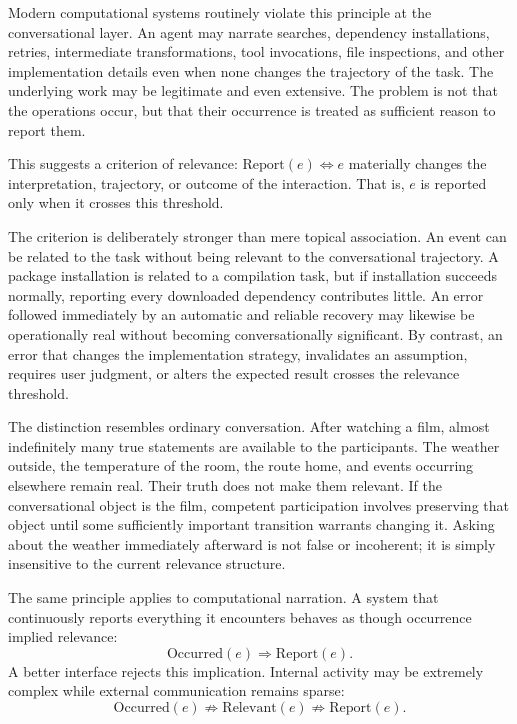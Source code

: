 Modern computational systems routinely violate this principle at the conversational layer. An agent may narrate searches, dependency installations, retries, intermediate transformations, tool invocations, file inspections, and other implementation details even when none changes the trajectory of the task. The underlying work may be legitimate and even extensive. The problem is not that the operations occur, but that their occurrence is treated as sufficient reason to report them.

This suggests a criterion of relevance: $\mathrm{Report}(e) \iff e$ materially changes the interpretation, trajectory, or outcome of the interaction. That is, $e$ is reported only when it crosses this threshold.

The criterion is deliberately stronger than mere topical association. An event can be related to the task without being relevant to the conversational trajectory. A package installation is related to a compilation task, but if installation succeeds normally, reporting every downloaded dependency contributes little. An error followed immediately by an automatic and reliable recovery may likewise be operationally real without becoming conversationally significant. By contrast, an error that changes the implementation strategy, invalidates an assumption, requires user judgment, or alters the expected result crosses the relevance threshold.

The distinction resembles ordinary conversation. After watching a film, almost indefinitely many true statements are available to the participants. The weather outside, the temperature of the room, the route home, and events occurring elsewhere remain real. Their truth does not make them relevant. If the conversational object is the film, competent participation involves preserving that object until some sufficiently important transition warrants changing it. Asking about the weather immediately afterward is not false or incoherent; it is simply insensitive to the current relevance structure.

The same principle applies to computational narration. A system that continuously reports everything it encounters behaves as though occurrence implied relevance:
\[
\mathrm{Occurred}(e) \Rightarrow \mathrm{Report}(e).
\]
A better interface rejects this implication. Internal activity may be extremely complex while external communication remains sparse:
\[
\mathrm{Occurred}(e) \not\Rightarrow \mathrm{Relevant}(e) \not\Rightarrow \mathrm{Report}(e).
\]


